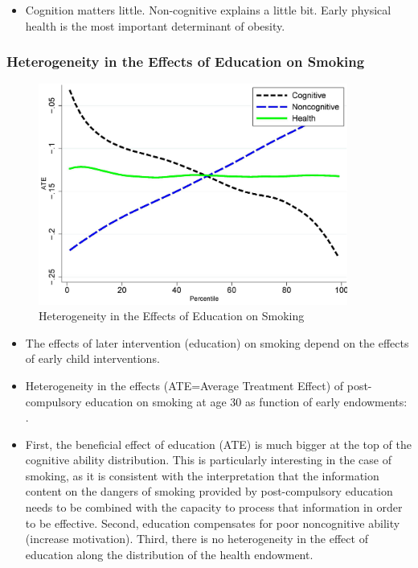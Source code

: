 \begin{itemize}
    \item Cognition matters little. Non-cognitive explains a little bit. Early physical health is the most important determinant of obesity.
\end{itemize}

\subsubsection{Heterogeneity in the Effects of Education on Smoking}    
\begin{figure}[H]%
                \centering
                \includegraphics[width=4in]{images/ch3/47.png}
                \caption {Heterogeneity in the Effects of Education on Smoking}
            \end{figure} 
            
\begin{itemize}
    \item The effects of later intervention (education) on smoking depend on the effects of early child interventions.
    \item Heterogeneity in the effects (ATE=Average Treatment Effect) of post-compulsory education on smoking at age 30 as function of early endowments: .
    \item First, the beneficial effect of education (ATE) is much bigger at the top of the cognitive ability distribution. This is particularly interesting in the case of smoking, as it is consistent with the interpretation that the information content on the dangers of smoking provided by post-compulsory education needs to be combined with the capacity to process that information in order to be effective. Second,  education compensates for poor noncognitive ability (increase motivation). Third, there is no heterogeneity in the effect of education along the distribution of the health endowment. 
 
\end{itemize}

